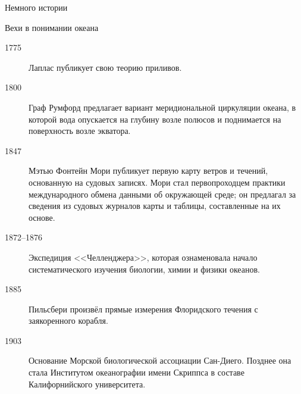 \begin{chapter}{Немного истории}
\begin{section}{Вехи в понимании океана}
\begin{description}
\item[1775] Лаплас публикует свою теорию приливов.

\item[1800] Граф Румфорд предлагает вариант
меридиональной циркуляции океана, в которой вода опускается на глубину
возле полюсов и поднимается на поверхность возле экватора.
%

\item[1847] Мэтью Фонтейн Мори публикует первую карту ветров и
течений, основанную на судовых записях. Мори стал первопроходцем практики
международного обмена данными об окружающей среде; он предлагал за сведения из 
судовых журналов карты и таблицы, составленные на их основе.
%

\item[1872--1876] Экспедиция <<Челленджера>>, которая ознаменовала начало
систематического изучения биологии, химии и физики океанов.
%


\item[1885] Пильсбери произвёл прямые измерения Флоридского течения с
заякоренного корабля.
%


\item[1903] Основание Морской биологической ассоциации Сан-Диего.
Позднее она стала Институтом океанографии имени Скриппса в составе
Калифорнийского университета.
%


\end{description}
\end{section}
\end{chapter}
